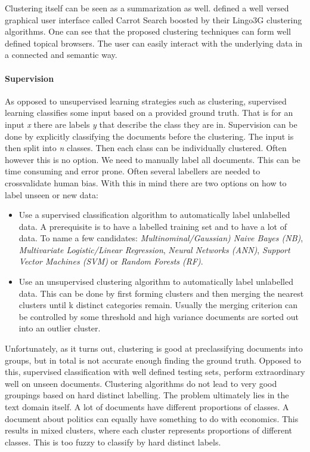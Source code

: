   Clustering itself can be seen as a summarization as well. \cite{Carrot2Search2003} defined a well versed graphical user interface called Carrot Search boosted by their Lingo3G clustering algorithms. One can see that the proposed clustering techniques can form well defined topical browsers. The user can easily interact with the underlying data in a connected and semantic way.

  \paragraph{Supervision}

    As opposed to unsupervised learning strategies such as clustering, supervised learning classifies some input based on a provided ground truth. That is for an input \emph{x} there are labels \emph{y} that describe the class they are in. Supervision can be done by explicitly classifying the documents before the clustering. The input is then split into \emph{n} classes. Then each class can be individually clustered. Often however this is no option. We need to manually label all documents. This can be time consuming and error prone. Often several labellers are needed to crossvalidate human bias.
    With this in mind there are two options on how to label unseen or new data:

      \begin{itemize}
        \item Use a supervised classification algorithm to automatically label unlabelled data. A prerequisite is to have a labelled training set and to have a lot of data. To name a few candidates: \emph{Multinominal/Gaussian) Naive Bayes (NB)}, \emph{Multivariate Logistic/Linear Regression}, \emph{Neural Networks (ANN)}, \emph{Support Vector Machines (SVM)} or \emph{Random Forests (RF)}. \cite{BishopML}
        \item Use an unsupervised clustering algorithm to automatically label unlabelled data. This can be done by first forming clusters and then merging the nearest clusters until k distinct categories remain. Usually the merging criterion can be controlled by some threshold and high variance documents are sorted out into an outlier cluster.
      \end{itemize}

    Unfortunately, as it turns out, clustering is good at preclassifying documents into groups, but in total is not accurate enough finding the ground truth. Opposed to this, supervised classification with well defined testing sets, perform extraordinary well on unseen documents. Clustering algorithms do not lead to very good groupings based on hard distinct labelling. The problem ultimately lies in the text domain itself. A lot of documents have different proportions of classes. A document about politics can equally have something to do with economics. This results in mixed clusters, where each cluster represents proportions of different classes. This is too fuzzy to classify by hard distinct labels.\\

